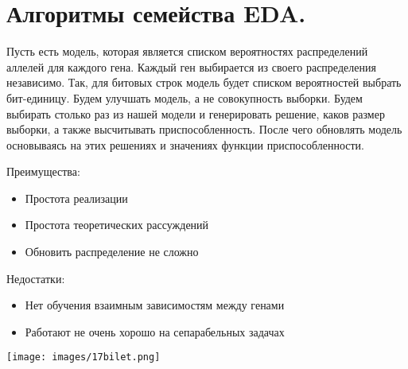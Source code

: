 \section{Алгоритмы семейства EDA.}

Пусть есть модель, которая является списком вероятностях распределений аллелей для каждого гена. Каждый ген выбирается из своего распределения независимо. Так, для битовых строк модель  будет списком вероятностей выбрать бит-единицу. Будем улучшать модель, а не совокупность выборки. Будем выбирать столько раз из нашей модели и генерировать решение, каков размер выборки, а также высчитывать приспособленность. После чего обновлять модель основываясь на этих решениях и значениях функции приспособленности.

Преимущества:
\begin{itemize}
      \item Простота реализации
      \item Простота теоретических рассуждений
      \item Обновить распределение не сложно
   \end{itemize}

Недостатки:
\begin{itemize}
      \item Нет обучения взаимным зависимостям между генами
      \item Работают не очень хорошо на сепарабельных задачах
   \end{itemize}

\texttt{[image: images/17bilet.png]}  


